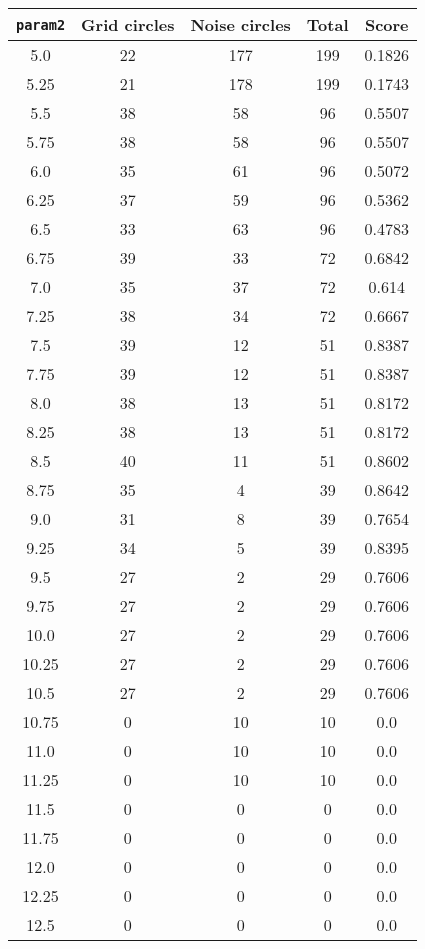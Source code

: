 \documentclass[letterpaper, 12pt]{article}
\begin{document}
\begin{longtable}{|c|c|c|c|c|}
\hline
\textbf{\texttt{param2}} & \textbf{Grid circles} & \textbf{Noise circles} & \textbf{Total} & \textbf{Score} \\
\hline
5.0 & 22 & 177 & 199 & 0.1826 \\
\hline
5.25 & 21 & 178 & 199 & 0.1743 \\
\hline
5.5 & 38 & 58 & 96 & 0.5507 \\
\hline
5.75 & 38 & 58 & 96 & 0.5507 \\
\hline
6.0 & 35 & 61 & 96 & 0.5072 \\
\hline
6.25 & 37 & 59 & 96 & 0.5362 \\
\hline
6.5 & 33 & 63 & 96 & 0.4783 \\
\hline
6.75 & 39 & 33 & 72 & 0.6842 \\
\hline
7.0 & 35 & 37 & 72 & 0.614 \\
\hline
7.25 & 38 & 34 & 72 & 0.6667 \\
\hline
7.5 & 39 & 12 & 51 & 0.8387 \\
\hline
7.75 & 39 & 12 & 51 & 0.8387 \\
\hline
8.0 & 38 & 13 & 51 & 0.8172 \\
\hline
8.25 & 38 & 13 & 51 & 0.8172 \\
\hline
8.5 & 40 & 11 & 51 & 0.8602 \\
\hline
8.75 & 35 & 4 & 39 & 0.8642 \\
\hline
9.0 & 31 & 8 & 39 & 0.7654 \\
\hline
9.25 & 34 & 5 & 39 & 0.8395 \\
\hline
9.5 & 27 & 2 & 29 & 0.7606 \\
\hline
9.75 & 27 & 2 & 29 & 0.7606 \\
\hline
10.0 & 27 & 2 & 29 & 0.7606 \\
\hline
10.25 & 27 & 2 & 29 & 0.7606 \\
\hline
10.5 & 27 & 2 & 29 & 0.7606 \\
\hline
10.75 & 0 & 10 & 10 & 0.0 \\
\hline
11.0 & 0 & 10 & 10 & 0.0 \\
\hline
11.25 & 0 & 10 & 10 & 0.0 \\
\hline
11.5 & 0 & 0 & 0 & 0.0 \\
\hline
11.75 & 0 & 0 & 0 & 0.0 \\
\hline
12.0 & 0 & 0 & 0 & 0.0 \\
\hline
12.25 & 0 & 0 & 0 & 0.0 \\
\hline
12.5 & 0 & 0 & 0 & 0.0 \\

\end{longtable}
\end{document}
